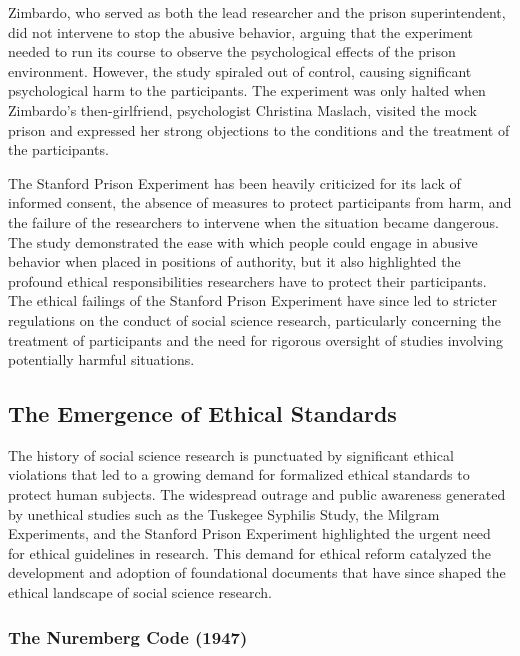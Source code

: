 \documentclass[
]{book}
\begin{document}
Zimbardo, who served as both the lead researcher and the prison superintendent, did not intervene to stop the abusive behavior, arguing that the experiment needed to run its course to observe the psychological effects of the prison environment. However, the study spiraled out of control, causing significant psychological harm to the participants. The experiment was only halted when Zimbardo's then-girlfriend, psychologist Christina Maslach, visited the mock prison and expressed her strong objections to the conditions and the treatment of the participants.

The Stanford Prison Experiment has been heavily criticized for its lack of informed consent, the absence of measures to protect participants from harm, and the failure of the researchers to intervene when the situation became dangerous. The study demonstrated the ease with which people could engage in abusive behavior when placed in positions of authority, but it also highlighted the profound ethical responsibilities researchers have to protect their participants. The ethical failings of the Stanford Prison Experiment have since led to stricter regulations on the conduct of social science research, particularly concerning the treatment of participants and the need for rigorous oversight of studies involving potentially harmful situations.

\subsection*{The Emergence of Ethical Standards}\label{the-emergence-of-ethical-standards}

The history of social science research is punctuated by significant ethical violations that led to a growing demand for formalized ethical standards to protect human subjects. The widespread outrage and public awareness generated by unethical studies such as the Tuskegee Syphilis Study, the Milgram Experiments, and the Stanford Prison Experiment highlighted the urgent need for ethical guidelines in research. This demand for ethical reform catalyzed the development and adoption of foundational documents that have since shaped the ethical landscape of social science research.

\subsubsection*{The Nuremberg Code (1947)}\label{the-nuremberg-code-1947}
\end{document}
